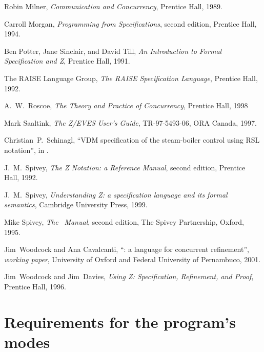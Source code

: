 \documentclass{report}
\begin{document}
\begin{thebibliography}{XX}
 Robin Milner, \emph{Communication and
    Concurrency}, Prentice Hall, 1989.

 Carroll Morgan, \emph{Programming from
    Specifications}, second edition, Prentice Hall, 1994.

 Ben Potter, Jane Sinclair, and David
  Till, \emph{An Introduction to Formal Specification and Z}, Prentice
  Hall, 1991.

 The RAISE Language Group, \emph{The RAISE
    Specification Language}, Prentice Hall, 1992.

 A.~W.~Roscoe, \emph{The Theory and Practice of
    Concurrency}, Prentice Hall, 1998

 Mark Saaltink, \emph{The Z/EVES User's Guide},
  TR-97-5493-06, ORA Canada, 1997.

 Christian~P.~Schinagl, ``VDM specification of
  the steam-boiler control using RSL notation'', in
  \cite[pp.428--452]{abrial-borger-langmaack-96}.

 J.~M.~Spivey, \emph{The Z Notation: a Reference
    Manual}, second edition, Prentice Hall, 1992.

 J.~M.~Spivey, \emph{Understanding Z: a
    specification language and its formal semantics}, Cambridge
  University Press, 1999.

 Mike Spivey, \emph{The} \fuzz\ \emph{Manual}, second
  edition, The Spivey Partnership, Oxford, 1995.

 Jim~Woodcock and Ana Cavalcanti,
  ``\Circus: a language for concurrent refinement'', \emph{working
    paper}, University of Oxford and Federal University of Pernambuco,
  2001.

 Jim~Woodcock and Jim~Davies, \emph{Using
    Z: Specification, Refinement, and Proof}, Prentice Hall, 1996.

\end{thebibliography}


\appendix

\chapter{Requirements for the program's modes}
\label{appendix:requirements}
\end{document}
